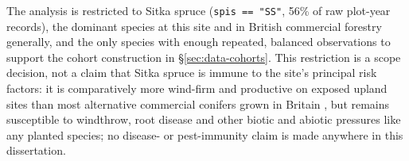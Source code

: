 The analysis is restricted to Sitka spruce (\texttt{spis == "SS"}, 56\% of raw plot-year records),
the dominant species at this site and in British commercial forestry generally, and the only
species with enough repeated, balanced observations to support the cohort construction in
\S\ref{sec:data-cohorts}. This restriction is a scope decision, not a claim that Sitka spruce is
immune to the site's principal risk factors: it is comparatively more wind-firm and productive on
exposed upland sites than most alternative commercial conifers grown in Britain
, but remains susceptible to windthrow, root disease and other biotic and abiotic
pressures like any planted species; no disease- or pest-immunity claim is made anywhere in this
dissertation.


